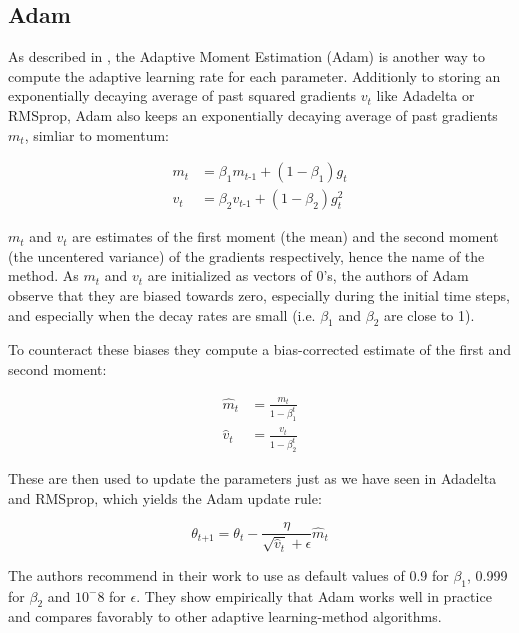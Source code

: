 \documentclass[12pt,oneside,a4paper,parskip]{scrbook}
\begin{document}
\subsection{Adam}
As described in \cite{Kingma2014AdamAM}, the Adaptive Moment Estimation (Adam) is another way to compute the adaptive 
learning rate for each parameter. Additionly to storing an exponentially decaying average of past squared gradients
$\textit{v}_t$ like Adadelta or RMSprop, Adam also keeps an exponentially decaying average of past gradients $\textit{m}_t$,
simliar to momentum:

\begin{equation}
  \begin{split}
  \textit{m}_t &= \beta_1\textit{m}_\textit{t-1} + (1-\beta_1)\textit{g}_t \\
  \textit{v}_t &= \beta_2\textit{v}_\textit{t-1} + (1-\beta_2)\textit{g}^2_t
  \end{split}
\end{equation}

$\textit{m}_t$ and $\textit{v}_t$ are estimates of the first moment (the mean) and the second moment (the uncentered variance)
of the gradients respectively, hence the name of the method. As $\textit{m}_t$ and $\textit{v}_t$ are initialized as vectors of 
0's, the authors of Adam observe that they are biased towards zero, especially during the initial time steps, and especially 
when the decay rates are small (i.e. $\beta_1$ and $\beta_2$ are close to 1).

To counteract these biases they compute a bias-corrected estimate of the first and second moment:

\begin{equation}
  \begin{split}
  \hat{m}_t &= \frac{\textit{m}_t}{1-\beta^t_1} \\
  \hat{v}_t &= \frac{\textit{v}_t}{1-\beta^t_2}
  \end{split}
\end{equation}

These are then used to update the parameters just as we have seen in Adadelta and RMSprop, which yields the Adam update rule:

\begin{equation}
\theta_\textit{t+1} = \theta_\textit{t}-\frac{\eta}{\sqrt{\hat{v}_t}+ \epsilon} \hat{m}_t
\end{equation}

The authors recommend in their work to use as default values of 0.9 for $\beta_1$, 0.999 for $\beta_2$ and $10^-8$ for $\epsilon$.
They show empirically that Adam works well in practice and compares favorably to other adaptive learning-method algorithms.
\cite{overvieDiffRSLVQ, Kingma2014AdamAM}
\end{document}
